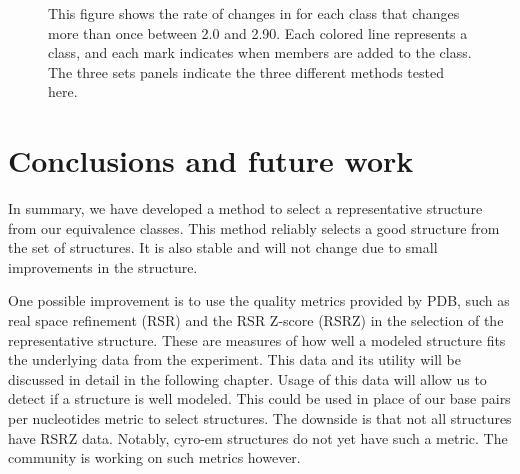 \begin{figure}
  \caption{This figure shows the rate of changes in for each class that changes
    more than once between 2.0 and 2.90. Each colored line represents a class,
    and each mark indicates when members are added to the class. The three sets
  panels indicate the three different methods tested here.}
  \label{fig:multi-change}
\end{figure}

\section{Conclusions and future work}

In summary, we have developed a method to select a representative structure from
our equivalence classes. This method reliably selects a good structure from the
set of structures. It is also stable and will not change due to small
improvements in the structure.

One possible improvement is to use the quality metrics provided by PDB, such as
real space refinement (RSR) and the RSR Z-score (RSRZ) in the selection of the
representative structure. These are measures of how well a modeled structure
fits the underlying data from the experiment. This data and its utility will be
discussed in detail in the following chapter. Usage of this data will allow us
to detect if a structure is well modeled. This could be used in place of our
base pairs per nucleotides metric to select structures. The downside is that not
all structures have RSRZ data. Notably, cyro-em structures do not yet have such
a metric. The community is working on such metrics however.
